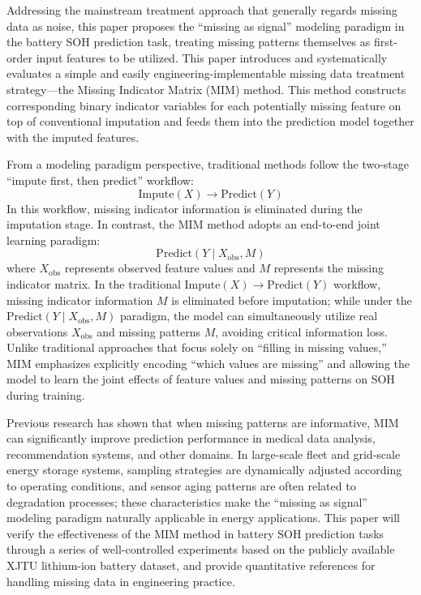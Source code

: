 \documentclass[10pt,a4paper]{article}
\begin{document}
Addressing the mainstream treatment approach that generally regards missing data as noise, this paper proposes the ``missing as signal'' modeling paradigm in the battery SOH prediction task, treating missing patterns themselves as first-order input features to be utilized. This paper introduces and systematically evaluates a simple and easily engineering-implementable missing data treatment strategy---the Missing Indicator Matrix (MIM) method\cite{jones1996indicator,van2023missing}. This method constructs corresponding binary indicator variables for each potentially missing feature on top of conventional imputation and feeds them into the prediction model together with the imputed features.

From a modeling paradigm perspective, traditional methods follow the two-stage ``impute first, then predict'' workflow:
\begin{equation}
    \text{Impute}(X) \rightarrow \text{Predict}(Y)
\end{equation}
In this workflow, missing indicator information is eliminated during the imputation stage. In contrast, the MIM method adopts an end-to-end joint learning paradigm:
\begin{equation}
    \text{Predict}(Y \mid X_{\mathrm{obs}}, M)
\end{equation}
where $X_{\mathrm{obs}}$ represents observed feature values and $M$ represents the missing indicator matrix. In the traditional $\text{Impute}(X)\rightarrow\text{Predict}(Y)$ workflow, missing indicator information $M$ is eliminated before imputation; while under the $\text{Predict}(Y \mid X_{\mathrm{obs}}, M)$ paradigm, the model can simultaneously utilize real observations $X_{\mathrm{obs}}$ and missing patterns $M$, avoiding critical information loss. Unlike traditional approaches that focus solely on ``filling in missing values,'' MIM emphasizes explicitly encoding ``which values are missing'' and allowing the model to learn the joint effects of feature values and missing patterns on SOH during training.

Previous research has shown that when missing patterns are informative, MIM can significantly improve prediction performance in medical data analysis, recommendation systems, and other domains\cite{sisk2023imputation,ehrig2025imputation}. In large-scale fleet and grid-scale energy storage systems, sampling strategies are dynamically adjusted according to operating conditions, and sensor aging patterns are often related to degradation processes; these characteristics make the ``missing as signal'' modeling paradigm naturally applicable in energy applications. This paper will verify the effectiveness of the MIM method in battery SOH prediction tasks through a series of well-controlled experiments based on the publicly available XJTU lithium-ion battery dataset, and provide quantitative references for handling missing data in engineering practice.
\end{document}
